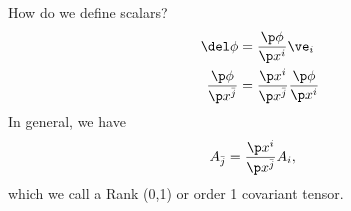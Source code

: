 \documentclass[a4paper, 11pt, normalem]{report}
\begin{document}
How do we define scalars? 
\begin{align}
    \del\phi &= \frac{\p\phi}{\p x^i}\ve_i \\
    \frac{\p\phi}{\p x^{\bar{j}}} &= \frac{\p x^i}{\p x^{\bar{j}}}\frac{\p\phi}{\p x^i}
\end{align}
In general, we have
\begin{align}
    A_{\bar{j}} &= \frac{\p x^i}{\p x^{\bar{j}}}A_i,
\end{align}
which we call a Rank (0,1) or order 1 covariant tensor.
\end{document}
